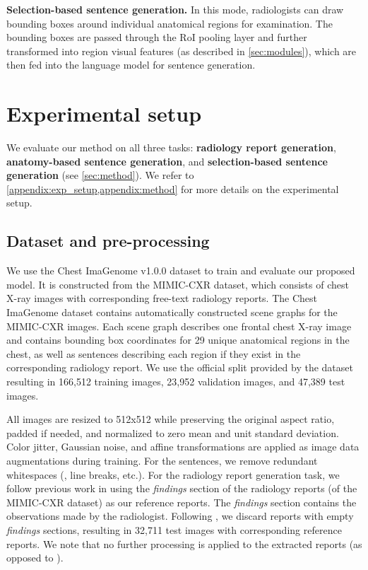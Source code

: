 \documentclass[10pt,twocolumn,letterpaper]{article}
\begin{document}
\noindent\textbf{Selection-based sentence generation.} In this mode, radiologists can draw bounding boxes around individual anatomical regions for examination. The bounding boxes are passed through the RoI pooling layer and further transformed into region visual features (as described in \cref{sec:modules}), which are then fed into the language model for sentence generation.

\section{Experimental setup}

We evaluate our method on all three tasks: \textbf{radiology report generation}, \textbf{anatomy-based sentence generation}, and \textbf{selection-based sentence generation} (see \cref{sec:method}). We refer to \cref{appendix:exp_setup,appendix:method} for more details on the experimental setup.

\subsection{Dataset and pre-processing}

We use the Chest ImaGenome v1.0.0 \cite{wu2021chest, wu2021chestphysio, PhysioNet} dataset to train and evaluate our proposed model. It is constructed from the MIMIC-CXR \cite{johnson2019mimic, johnson2019mimicphysio} dataset, which consists of chest X-ray images with corresponding free-text radiology reports. The Chest ImaGenome dataset contains automatically constructed scene graphs for the MIMIC-CXR images. Each scene graph describes one frontal chest X-ray image and contains bounding box coordinates for 29 unique anatomical regions in the chest, as well as sentences describing each region if they exist in the corresponding radiology report. We use the official split provided by the dataset resulting in 166,512 training images, 23,952 validation images, and 47,389 test images.

All images are resized to 512x512 while preserving the original aspect ratio, padded if needed, and normalized to zero mean and unit standard deviation. Color jitter, Gaussian noise, and affine transformations are applied as image data augmentations during training. For the sentences, we remove redundant whitespaces (\ie, line breaks, etc.). For the radiology report generation task, we follow previous work \cite{liu2019clinically, boag2020baselines, miura2021improving, nicolson2022improving} in using the \emph{findings} section of the radiology reports (of the MIMIC-CXR dataset) as our reference reports. The \emph{findings} section contains the observations made by the radiologist. Following \cite{miura2021improving, nicolson2022improving}, we discard reports with empty \emph{findings} sections, resulting in 32,711 test images with corresponding reference reports. We note that no further processing is applied to the extracted reports (as opposed to \eg \cite{nicolson2022improving}).
\end{document}
